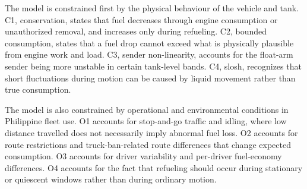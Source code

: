 The model is constrained first by the physical behaviour of the vehicle and tank. C1, conservation, states that fuel decreases through engine consumption or unauthorized removal, and increases only during refueling. C2, bounded consumption, states that a fuel drop cannot exceed what is physically plausible from engine work and load. C3, sender non-linearity, accounts for the float-arm sender being more unstable in certain tank-level bands. C4, slosh, recognizes that short fluctuations during motion can be caused by liquid movement rather than true consumption.

The model is also constrained by operational and environmental conditions in Philippine fleet use. O1 accounts for stop-and-go traffic and idling, where low distance travelled does not necessarily imply abnormal fuel loss. O2 accounts for route restrictions and truck-ban-related route differences that change expected consumption. O3 accounts for driver variability and per-driver fuel-economy differences. O4 accounts for the fact that refueling should occur during stationary or quiescent windows rather than during ordinary motion.

